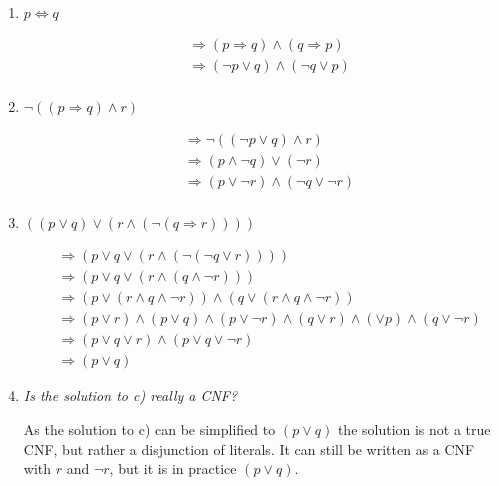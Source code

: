 \begin{enumerate}[label=\alph*)]
    \item $ p \Longleftrightarrow q $ 

        \begin{align*}
            &\Rightarrow (p \Longrightarrow q) \land (q \Longrightarrow p) \\
            &\Rightarrow (\neg p \lor q) \land (\neg q \lor p) \\
        \end{align*}

    \item $ \neg ((p \Longrightarrow q) \land r ) $
    
        \begin{align*}
            &\Rightarrow \neg ((\neg p \lor q) \land r) \\
            &\Rightarrow (p \land \neg q) \lor (\neg r) \\
            &\Rightarrow (p \lor \neg r) \land (\neg q \lor \neg r)  \\
        \end{align*}

    \item $ ((p \lor q) \lor (r \land (\neg (q \Longrightarrow r)))) $
    
        \begin{align*}
            &\Rightarrow (p \lor q \lor (r \land (\neg (\neg q \lor r)))) \\
            &\Rightarrow (p \lor q \lor (r \land (q \land \neg r))) \\
            &\Rightarrow (p \lor (r \land q \land \neg r)) \land (q \lor (r \land q \land \neg r)) \\
            &\Rightarrow (p \lor r) \land (p \lor q) \land (p \lor \neg r) \land (q \lor r) \land ( \lor p) \land (q \lor \neg r) \\
            &\Rightarrow (p \lor q \lor r) \land (p \lor q \lor \neg r) \\
            &\Rightarrow (p \lor q)
        \end{align*}

    \item \textit{Is the solution to c) really a CNF?} 
    
        As the solution to c) can be simplified to $(p \lor q)$ the solution is not a true CNF, but rather a disjunction of literals. It can still be written as a CNF with $r$ and $\neg r$, but it is in practice $(p \lor q)$. 

\end{enumerate}

